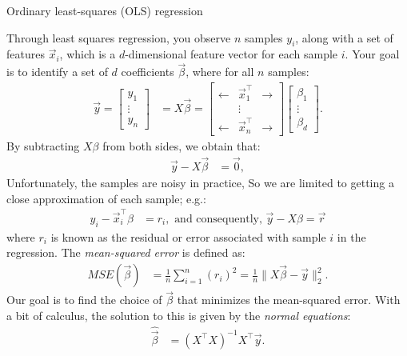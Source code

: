 \begin{floatingbox}[h]\caption{Ordinary least-squares (OLS) regression}
\label{box:ch7:oos:lsreg}
Through least squares regression, you observe $n$ samples $y_i$, along with a set of features $\vec x_i$, which is a $d$-dimensional feature vector for each sample $i$. Your goal is to identify a set of $d$ coefficients $\vec \beta$, where for all $n$ samples:
\begin{align*}
    \vec y = \begin{bmatrix}
        y_1 \\
        \vdots \\
        y_n
    \end{bmatrix}&= X \vec \beta = \begin{bmatrix}
        \leftarrow & \vec x_1^\top & \rightarrow \\
        & \vdots &  \\
        \leftarrow & \vec x_n^\top & \rightarrow 
    \end{bmatrix}\begin{bmatrix}
        \beta_1 \\
        \vdots \\
        \beta_d
    \end{bmatrix}.
\end{align*}
By subtracting $X\beta$ from both sides, we obtain that:
\begin{align*}
    \vec y - X\vec\beta &= \vec 0,
\end{align*}
Unfortunately, the samples are noisy in practice, So we are limited to getting a close approximation of each sample; e.g.:
\begin{align*}
    y_i - \vec x_i^\top \beta &= r_i,\text{ and consequently, }\vec y - X\beta = \vec r
\end{align*}
where $r_i$ is known as the residual or error associated with sample $i$ in the regression. The \textit{mean-squared error} is defined as:
\begin{align*}
    MSE(\vec \beta) &= \frac{1}{n}\sum_{i = 1}^n\left(r_i\right)^2 = \frac{1}{n}\|X\vec \beta - \vec y\|^2_2.
\end{align*}
Our goal is to find the choice of $\vec \beta$ that minimizes the mean-squared error. With a bit of calculus, the solution to this is given by the \textit{normal equations}:
\begin{align*}
    \hat{\vec \beta} &= (X^\top X)^{-1}X^\top \vec y.
\end{align*}
\end{floatingbox}

